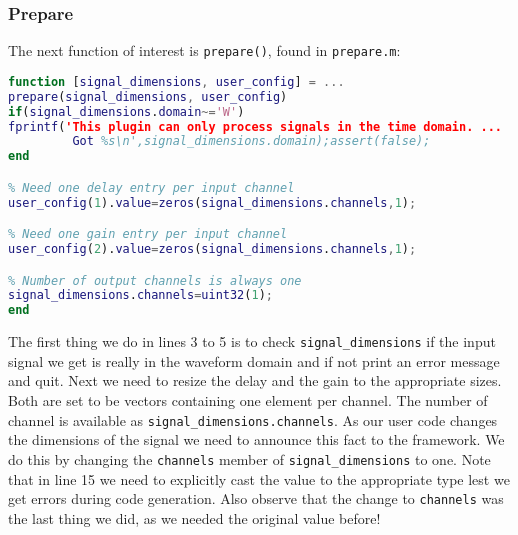 \documentclass[11pt,a4paper,twoside]{article}
\newcommand{\+}{\discretionary{\mbox{\scriptsize$\hookleftarrow$}}{}{}}
\begin{document}
\subsubsection*{Prepare}
The next function of interest is \texttt{prepare()}, found in \texttt{prepare.m}:
\begin{lstlisting}[language=Matlab]
function [signal_dimensions, user_config] = ...
prepare(signal_dimensions, user_config)
if(signal_dimensions.domain~='W')
fprintf('This plugin can only process signals in the time domain. ...
         Got %s\n',signal_dimensions.domain);assert(false);
end

% Need one delay entry per input channel
user_config(1).value=zeros(signal_dimensions.channels,1);

% Need one gain entry per input channel
user_config(2).value=zeros(signal_dimensions.channels,1);

% Number of output channels is always one
signal_dimensions.channels=uint32(1);
end
\end{lstlisting}
The first thing we do in lines 3 to 5 is to check \texttt{signal\_dimensions} if the
input signal we get is really in the waveform domain and if not print an error
message and quit.
Next we need to resize the delay and the gain to the appropriate sizes. Both are
set to be vectors containing one element per channel. The number of channel is
available as \texttt{signal\_dimensions.channels}. As our user code changes the
dimensions of the signal we need to announce this fact to the \mha{} framework.
We do this by changing the \texttt{channels} member of \texttt{signal\_dimensions} to one.
Note that in line 15 we need to explicitly cast the value to the appropriate type lest we
get errors during code generation. Also observe that the change to \texttt{channels}
was the last thing we did, as we needed the original value before!
\end{document}
